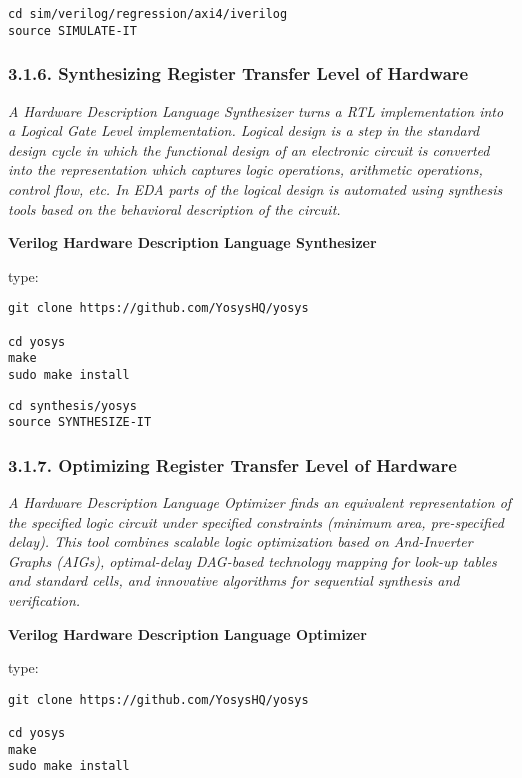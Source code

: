 \documentclass[]{article}
\begin{document}
\begin{verbatim}
cd sim/verilog/regression/axi4/iverilog
source SIMULATE-IT
\end{verbatim}

\subsubsection{3.1.6. Synthesizing Register Transfer Level of
Hardware}\label{synthesizing-register-transfer-level-of-hardware}

\emph{A Hardware Description Language Synthesizer turns a RTL
implementation into a Logical Gate Level implementation. Logical design
is a step in the standard design cycle in which the functional design of
an electronic circuit is converted into the representation which
captures logic operations, arithmetic operations, control flow, etc. In
EDA parts of the logical design is automated using synthesis tools based
on the behavioral description of the circuit.}

\textbf{Verilog Hardware Description Language Synthesizer}

type:

\begin{verbatim}
git clone https://github.com/YosysHQ/yosys

cd yosys
make
sudo make install
\end{verbatim}

\begin{verbatim}
cd synthesis/yosys
source SYNTHESIZE-IT
\end{verbatim}

\subsubsection{3.1.7. Optimizing Register Transfer Level of
Hardware}\label{optimizing-register-transfer-level-of-hardware}

\emph{A Hardware Description Language Optimizer finds an equivalent
representation of the specified logic circuit under specified
constraints (minimum area, pre-specified delay). This tool combines
scalable logic optimization based on And-Inverter Graphs (AIGs),
optimal-delay DAG-based technology mapping for look-up tables and
standard cells, and innovative algorithms for sequential synthesis and
verification.}

\textbf{Verilog Hardware Description Language Optimizer}

type:

\begin{verbatim}
git clone https://github.com/YosysHQ/yosys

cd yosys
make
sudo make install
\end{verbatim}
\end{document}
